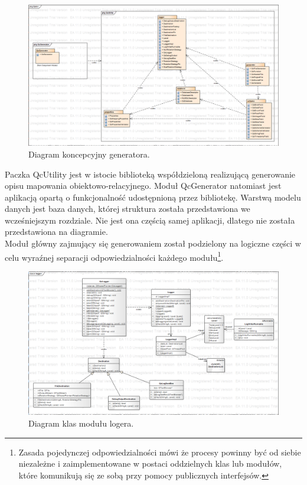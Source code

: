 \documentclass[12pt]{report}
\begin{document}
\begin{figure}[h]
	\centering
	\includegraphics[width=1.6\textwidth, angle=90]{images/Qubic.png}
	\caption{Diagram koncepcyjny generatora.}
\end{figure}
\FloatBarrier

Paczka QcUtility jest w istocie biblioteką współdzieloną realizującą generowanie opisu mapowania obiektowo-relacyjnego. Moduł QcGenerator natomiast jest aplikacją opartą o funkcjonalność udostępnioną przez bibliotekę. Warstwą modelu danych jest baza danych, której struktura została przedstawiona we wcześniejszym rozdziale. Nie jest ona częścią samej aplikacji, dlatego nie została przedstawiona na diagramie. \\
	\indent Moduł główny zajmujący się generowaniem został podzielony na logiczne części w celu wyraźnej separacji odpowiedzialności każdego modułu\footnote{Zasada pojedynczej odpowiedzialności mówi że procesy powinny być od siebie niezależne i zaimplementowane w postaci oddzielnych klas lub modułów, które komunikują się ze sobą przy pomocy publicznych interfejsów.}.

\begin{figure}[h]
	\centering
	\includegraphics[width=.95\textwidth, angle=90]{images/logger.png}
	\caption{Diagram klas modułu logera.}
\end{figure}
\FloatBarrier
\end{document}

